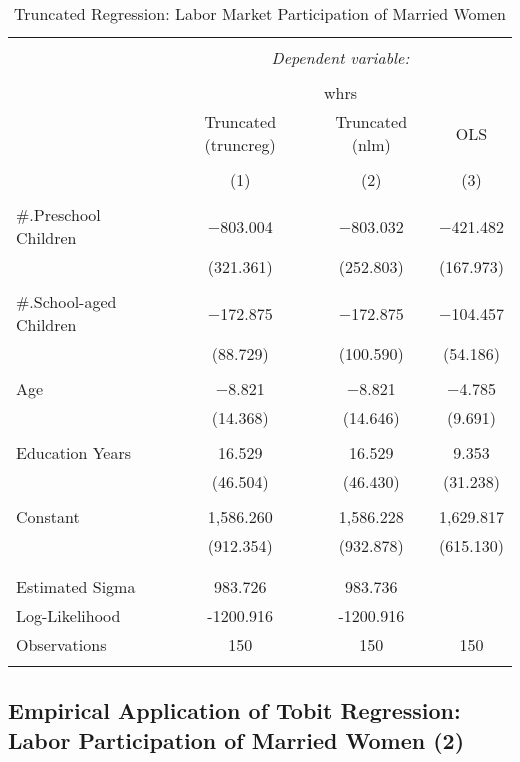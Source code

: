 \documentclass[
  12pt,
]{article}
\begin{document}
\begin{table}[t] \centering 
  \caption{Truncated Regression: Labor Market Participation of Married Women} 
  \label{lfp} 
\begin{tabular}{@{\extracolsep{5pt}}lccc} 
\\[-1.8ex]\hline 
\hline \\[-1.8ex] 
 & \multicolumn{3}{c}{\textit{Dependent variable:}} \\ 
\cline{2-4} 
\\[-1.8ex] & \multicolumn{3}{c}{whrs} \\ 
 & Truncated (truncreg) & Truncated (nlm) & OLS \\ 
\\[-1.8ex] & (1) & (2) & (3)\\ 
\hline \\[-1.8ex] 
 \#.Preschool Children & $-$803.004 & $-$803.032 & $-$421.482 \\ 
  & (321.361) & (252.803) & (167.973) \\ 
  & & & \\ 
 \#.School-aged Children & $-$172.875 & $-$172.875 & $-$104.457 \\ 
  & (88.729) & (100.590) & (54.186) \\ 
  & & & \\ 
 Age & $-$8.821 & $-$8.821 & $-$4.785 \\ 
  & (14.368) & (14.646) & (9.691) \\ 
  & & & \\ 
 Education Years & 16.529 & 16.529 & 9.353 \\ 
  & (46.504) & (46.430) & (31.238) \\ 
  & & & \\ 
 Constant & 1,586.260 & 1,586.228 & 1,629.817 \\ 
  & (912.354) & (932.878) & (615.130) \\ 
  & & & \\ 
\hline \\[-1.8ex] 
Estimated Sigma & 983.726 & 983.736 &  \\ 
Log-Likelihood & -1200.916 & -1200.916 &  \\ 
Observations & 150 & 150 & 150 \\ 
\hline 
\hline \\[-1.8ex] 
\end{tabular} 
\end{table}

\hypertarget{empirical-application-of-tobit-regression-labor-participation-of-married-women-2}{%
\subsection{Empirical Application of Tobit Regression: Labor Participation of Married Women (2)}\label{empirical-application-of-tobit-regression-labor-participation-of-married-women-2}}
\end{document}
